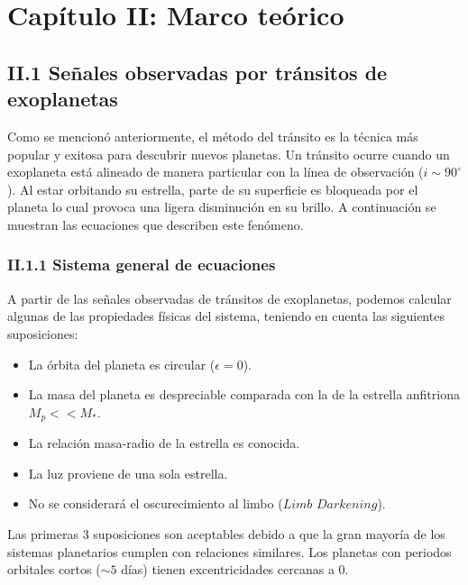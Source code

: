 \chapter*{\textbf{Capítulo II: Marco teórico}}
\setcounter{chapter}{2}

\section*{II.1 Señales observadas por tránsitos de exoplanetas}

Como se mencionó anteriormente, el método del tránsito es la técnica más popular y exitosa para descubrir nuevos planetas. Un tránsito ocurre cuando un exoplaneta está alineado de manera particular con la línea de observación ($i\sim 90^{\circ}$). Al estar orbitando su estrella, parte de su superficie es bloqueada por el planeta lo cual provoca una ligera disminución en su brillo. A continuación se muestran las ecuaciones que describen este fenómeno.

\subsection*{II.1.1 Sistema general de ecuaciones}

A partir de las señales observadas de tránsitos de exoplanetas, podemos calcular algunas de las propiedades físicas del sistema, teniendo en cuenta las siguientes suposiciones:

\begin{itemize}
\item La órbita del planeta es circular ($\epsilon = 0$).
\item La masa del planeta es despreciable comparada con la de la estrella anfitriona \\ $M_{p} << M_{*}$.
\item La relación masa-radio de la estrella es conocida.
\item La luz proviene de una sola estrella.
\item No se considerará el oscurecimiento al limbo ($\textit{Limb Darkening}$).
\end{itemize}

Las primeras 3 suposiciones son aceptables debido a que la gran mayoría de los sistemas planetarios cumplen con relaciones similares. Los planetas con periodos orbitales cortos ($\sim 5$ días) tienen excentricidades cercanas a 0.


